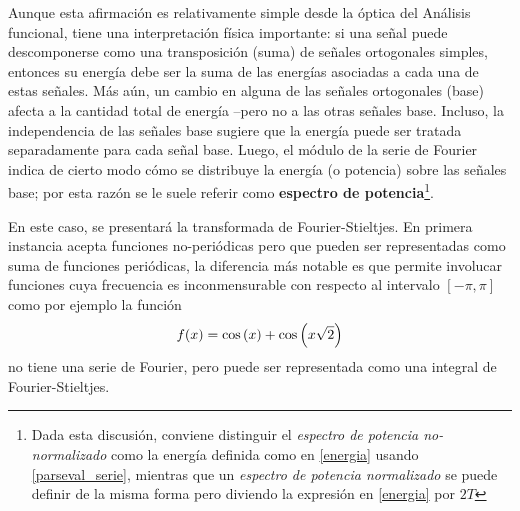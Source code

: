 Aunque esta afirmaci\'on
es relativamente simple desde la \'optica del An\'alisis funcional, tiene una interpretaci\'on
f\'isica importante: si una se\~nal puede descomponerse como una transposici\'on (suma) de 
se\~nales ortogonales simples, entonces su energ\'ia debe ser la suma de las energ\'ias 
asociadas a cada una de estas se\~nales. M\'as a\'un, un cambio en alguna de las se\~nales
ortogonales (base) afecta a la cantidad total de energ\'ia --pero no a las otras se\~nales base.
Incluso,
la independencia de las se\~nales base sugiere que la energ\'ia puede ser tratada separadamente
para cada se\~nal base. Luego, el m\'odulo de la serie de Fourier indica de cierto modo
c\'omo se distribuye la energ\'ia (o potencia) sobre las se\~nales base; por esta raz\'on se le
suele referir como \textbf{espectro de potencia}\footnote{Dada esta discusi\'on, conviene 
distinguir el \textit{espectro de potencia no-normalizado} como la energ\'ia definida como
en \ref{energia} usando \ref{parseval_serie}, mientras que un \textit{espectro de potencia 
normalizado} se puede definir de la misma forma pero diviendo la expresi\'on en 
\ref{energia} por $2T$}.



En este caso, se presentar\'a la transformada de Fourier-Stieltjes. En primera instancia
acepta funciones no-peri\'odicas pero que pueden ser representadas como suma de funciones
peri\'odicas, la diferencia m\'as notable es que permite involucar funciones cuya frecuencia
es inconmensurable con respecto al intervalo $[-\pi,\pi]$ como por ejemplo la funci\'on
$$
f(x) = \mathrm{cos}\left( x \right) + \mathrm{cos}\left( x\sqrt{2} \right)
$$
no tiene una serie de Fourier, pero puede ser representada como una integral de Fourier-Stieltjes.

